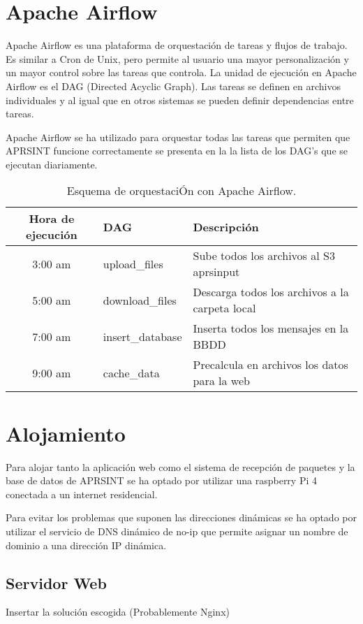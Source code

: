 \section{Apache Airflow}
Apache Airflow es una plataforma de orquestación de tareas y flujos de trabajo. Es similar a Cron de Unix, pero permite al usuario una mayor personalización y un mayor control sobre las tareas que controla. La unidad de ejecución en Apache Airflow es el DAG (Directed Acyclic Graph). Las tareas se definen en archivos individuales y al igual que en otros sistemas se pueden definir dependencias entre tareas.

Apache Airflow se ha utilizado para orquestar todas las tareas que permiten que APRSINT funcione correctamente se presenta en la  la lista de los DAG's que se ejecutan diariamente.

\begin{table}[htbp]
    \centering
    \begin{tabular}{|c|l|l|}
        \hline
        \textbf{Hora de ejecución} & \textbf{DAG} & \textbf{Descripción} \\
        \hline
        3:00 am & upload\_files & Sube todos los archivos al S3 aprsinput \\
        \hline
        5:00 am & download\_files & Descarga todos los archivos a la carpeta local \\
        \hline
        7:00 am & insert\_database & Inserta todos los mensajes en la BBDD \\
		\hline
        9:00 am & cache\_data & Precalcula en archivos los datos para la web \\
        \hline
    \end{tabular}
    \caption{Esquema de orquestaciÓn con Apache Airflow.}
    \label{tab:airflow-sched}
\end{table}

\section{Alojamiento}
Para alojar tanto la aplicación web como el sistema de recepción de paquetes y la base de datos de APRSINT se ha optado por utilizar una raspberry Pi 4 conectada a un internet residencial. 

Para evitar los problemas que suponen las direcciones dinámicas se ha optado por utilizar el servicio de DNS dinámico de no-ip que permite asignar un nombre de dominio a una dirección IP dinámica. 

\subsection{Servidor Web}
Insertar la solución escogida (Probablemente Nginx)


